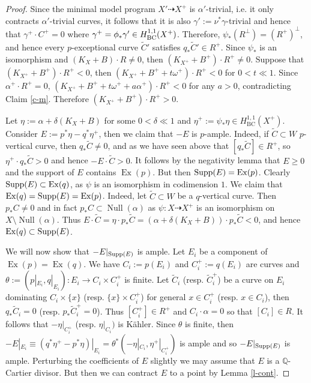 \documentclass[12pt]{amsart}
\theoremstyle{plain}
\theoremstyle{remark}
\theoremstyle{definition}
\def\BC{\operatorname{BC}}
\def\Null{\operatorname{Null}}
\newcommand{\<}{\leq}
\newcommand{\mbQ}{\mathbb{Q}}
\newcommand{\Supp}{{\rm Supp}}
\newcommand{\bir}{\dashrightarrow}
\def\Ex{\operatorname{Ex}}
\theoremstyle{definition}
\theoremstyle{definition}
\numberwithin{equation}{section}
\theoremstyle{remark}
\begin{document}
\begin{proof}
Since the minimal model program $X'\dasharrow X^+$ is $\alpha'$-trivial, i.e. it only contracts $\alpha'$-trivial curves, it follows that it is also $\gamma ':=\nu ^* \gamma $-trivial and hence that $\gamma ^+\cdot C^+=0$ where $\gamma ^+=\phi _* \gamma '\in H^{1,1}_{\rm BC}(X^+)$.
Therefore, $\psi _*(R^\perp)=(R^+)^\perp$, and hence every $p$-exceptional curve $\tilde C'$ satisfies $q_*\tilde C'\in R^+$.
Since $\psi_*$ is an isomorphism and $(K_X+B)\cdot R\ne 0$, then $(K_{X^+}+B^+)\cdot R^+\ne 0$. Suppose that $(K_{X^+}+B^+)\cdot R^+< 0$, then 
$(K_{X^+}+B^++t\omega^+)\cdot R^+< 0$ for $0<t\ll 1$. Since 
$\alpha ^+\cdot R^+=0$, $(K_{X^+}+B^++t\omega^++a\alpha ^+)\cdot R^+< 0$ for any $a>0$, contradicting Claim \ref{c-m}. Therefore $(K_{X^+}+B^+)\cdot R^+>0$.

Let $\eta :=\alpha +\delta (K_{X}+B)$ for some $0<\delta \ll 1$ and  $\eta ^+:=\psi _* \eta\in H^{1,1}_{\BC}(X^+)$.
Consider $E:=p^*\eta -q^*\eta ^+$, then we claim that $-E$ is $p$-ample. Indeed, if  $\tilde C\subset W$ $p$-vertical curve, then $q_*\tilde C\ne 0$, and as we have seen above that $[q_*\tilde C]\in R^+$, so $\eta ^+\cdot q_*\tilde C>0$ and hence $-E\cdot \tilde C>0$. It follows by the negativity lemma that $E\geq 0$ and the support of $E$ contains $\Ex(p)$. But then ${\rm Supp}(E)=\Ex(p)$. Clearly $\Supp(E)\subset \Ex(q)$, as $\psi$ is an isomorphism in codimension $1$. 
We claim that $\Ex(q)=\Supp(E)=\Ex(p)$. Indeed, let $\tilde C\subset W$ be a $q$-vertical curve. Then $p_*C\neq 0$ and in fact $p_*C\subset \Null(\alpha)$ as $\psi:X\bir X^+$ is an isomorphism on $X\setminus\Null(\alpha)$. Thus $E\cdot \tilde C=\eta\cdot p_*\tilde C=(\alpha+\delta(K_X+B))\cdot p_*\tilde C<0$, and hence $\Ex(q)\subset \Supp(E)$. 

We will now show that $-E|_{{\rm Supp}(E)}$ is ample. Let $E_i$ be a component of $\Ex(p)=\Ex(q)$. We have $C_i:=p(E_i)$ and $C_i^+:=q(E_i)$ are curves and $\theta:=(p|_{E_i}, q|_{E_i}):E_i\to C_i\times C_i^+$ is finite. Let $\tilde C_i$ (resp. $\tilde C_i^+$) be a curve on $E_i$ dominating $C_i\times \{x\}$ (resp. $\{x\}\times C_i^+$) for general $x\in C_i^+$ (resp. $x\in C_i$), then $q_* \tilde C_i=0$ (resp. $p_*\tilde C_i^+=0$). Thus  $[C_i^+]\in R^+$ and $C_i\cdot \alpha =0$ so that  $[C_i]\in R$. It follows that $-\eta|_{C_i^+}$ (resp. $\eta|_{C_i}) $ is K\"ahler. Since $\theta $ is finite, then  $-E|_{E_i}\equiv (q^*\eta ^+-p^*\eta)|_{E_i}=\theta^*(-\eta|_{C_i},\eta^+|_{C^+_i})$ is ample and so 
$-E|_{{\rm Supp}(E)}$ is ample. Perturbing the coefficients of $E$ slightly we may assume that $E$ is a $\mbQ$-Cartier divisor. But then we can contract $E$ to a point by Lemma \ref{l-cont}. 


\end{proof}
\end{document}
